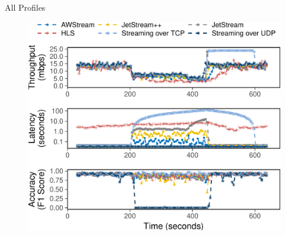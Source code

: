 \begin{frame}{All Profiles}
  \begin{figure}
    \includegraphics[width=0.9\linewidth]{figures/runtime_darknet-timeseries.pdf}
  \end{figure}
\end{frame}

